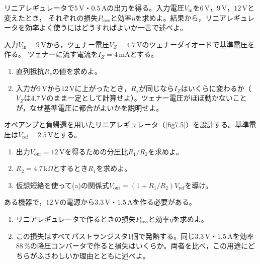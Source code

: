 \begin{章末問題}
\item \label{ex7.1}リニアレギュレータで$5$\,V・$0.5$\,Aの出力を得る。入力電圧$V_{\mathrm{in}}$を$6$\,V，$9$\,V，$12$\,Vと変えたとき，
それぞれの損失$P_{\mathrm{loss}}$と効率$\eta$を求めよ。結果から，リニアレギュレータを効率よく使うにはどうすればよいか一言で述べよ。

\item \label{ex7.2}入力$V_{\mathrm{in}} = 9$\,Vから，ツェナー電圧$V_Z = 4.7$\,Vのツェナーダイオードで基準電圧を作る。
ツェナーに流す電流を$I_Z = 4$\,mAとする。
\begin{enumerate}
\item[(a)] 直列抵抗$R_s$の値を求めよ。
\item[(b)] 入力が$9$\,Vから$12$\,Vに上がったとき，$R_s$が同じなら$I_Z$はいくらに変わるか（$V_Z$は$4.7$\,Vのまま一定として計算せよ）。ツェナー電圧がほぼ動かないことが，なぜ基準電圧に都合がよいかを説明せよ。
\end{enumerate}


\item \label{ex7.4}オペアンプと負帰還を用いたリニアレギュレータ（\ref{fig7.5}）を設計する。基準電圧は$V_{\mathrm{ref}} = 2.5$\,Vとする。
\begin{enumerate}
\item[(a)] 出力$V_{\mathrm{out}} = 12$\,Vを得るための分圧比$R_1/R_2$を求めよ。
\item[(b)] $R_2 = 4.7$\,k$\Omega$とするとき$R_1$を求めよ。
\item[(c)] 仮想短絡を使って(a)の関係式$V_{\mathrm{out}} = (1 + R_1/R_2) V_{\mathrm{ref}}$を導け。
\end{enumerate}

\item \label{ex7.5}ある機器で，$12$\,Vの電源から$3.3$\,V・$1.5$\,Aを作る必要がある。
\begin{enumerate}
\item[(a)] リニアレギュレータで作るときの損失$P_{\mathrm{loss}}$と効率$\eta$を求めよ。
\item[(b)] この損失はすべてパストランジスタ1個で発熱する。同じ$3.3$\,V・$1.5$\,Aを効率$88\,\%$の降圧コンバータで作ると損失はいくらか。両者を比べ，この用途にどちらがふさわしいか理由とともに述べよ。
\end{enumerate}


\end{章末問題}
